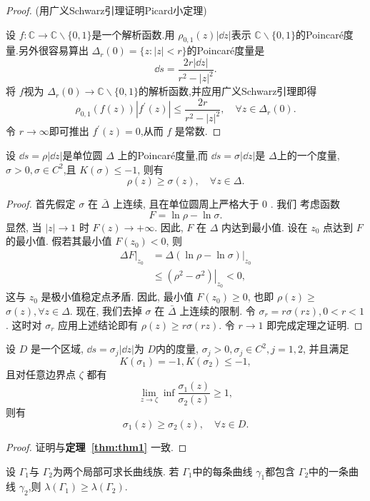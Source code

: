 \begin{proof}{(用广义Schwarz引理证明Picard小定理)}

    设 $f\colon \mathbb{C}\to \mathbb{C}\backslash \{0,1\} $是一个解析函数.用 $\rho_{0,1}(z)|\dd z|$表示 $\mathbb{C}\backslash \{0,1\}$的Poincar\'{e}度量.另外很容易算出 $\Delta_r (0)=\{z\colon |z|<r\}$的Poincar\'{e}度量是
    \[\dd s=\frac{2r|\dd z|}{r^2-|z|^2}.\]
    将 $f$视为 $\Delta_r (0)\to \mathbb{C}\backslash\{0,1\}$的解析函数,并应用广义Schwarz引理即得
    \[\rho_{0,1}(f(z))|f^\prime (z)|\leqslant \frac{2r}{r^2-|z|^2},\quad\forall z\in \Delta_r (0).\]
    令 $r\to\infty$即可推出 $f^\prime (z)=0$,从而 $f$ 是常数.
\end{proof}
\begin{thm}\label{thm:thm1}
    设 $\dd s=\rho |\dd z|$是单位圆 $\Delta$ 上的Poincar\'{e}度量,而 $\dd s=\sigma|\dd z|$是 $\Delta$上的一个度量, $\sigma>0,\sigma\in C^2$,且 $K(\sigma)\leqslant -1$, 则有
    \[\rho(z)\geqslant \sigma(z),\quad\forall z\in \Delta.\]
\end{thm}
\begin{proof}
    首先假定 $\sigma$ 在 $\bar{\Delta}$ 上连续, 且在单位圆周上严格大于 0 . 我们 考虑函数
$$
F=\ln \rho-\ln \sigma .
$$
显然, 当 $|z| \rightarrow 1$ 时 $F(z) \rightarrow+\infty$. 因此, $F$ 在 $\Delta$ 内达到最小值. 设在 $z_0$ 点达到 $F$ 的最小值. 假若其最小值 $F\left(z_0\right)<0$, 则
$$
\begin{aligned}
\left.\Delta F\right|_{z_0} & =\left.\Delta(\ln \rho-\ln \sigma)\right|_{z_0} \\
& \leqslant\left.\left(\rho^2-\sigma^2\right)\right|_{z_0}<0,
\end{aligned}
$$
这与 $z_0$ 是极小值稳定点矛盾. 因此, 最小值 $F\left(z_0\right) \geqslant 0$, 也即 $\rho(z) \geqslant$ $\sigma(z), \forall z \in \Delta$.
现在, 我们去掉 $\sigma$ 在 $\bar{\Delta}$ 上连续的限制. 令 $\sigma_r=r \sigma(r z), 0<r<1$. 这时对 $\sigma_r$ 应用上述结论即有 $\rho(z) \geqslant r \sigma(r z)$. 令 $r \rightarrow 1$ 即完成定理之证明.
\end{proof}
\begin{corollary}
    设 $D$ 是一个区域, $\dd s=\sigma_j |\dd z|$为 $D$内的度量, $\sigma_j>0,\sigma_j\in C^2,j=1,2$, 并且满足
    \[K(\sigma_1)=-1,K(\sigma_2)\leqslant -1,\]
    且对任意边界点 $\zeta$ 都有
    \[\lim_{z\to\zeta}\inf \frac{\sigma_1 (z)}{\sigma_2 (z)}\geqslant 1,\]
    则有
    \[\sigma_1 (z)\geqslant \sigma_2 (z),\quad\forall z\in D.\]
\end{corollary}
\begin{proof}
    证明与\textbf{定理~\ref{thm:thm1}} 一致.
\end{proof}
\begin{theorem}
    设 $\Gamma_1$与 $\Gamma_2$为两个局部可求长曲线族. 若 $\Gamma_1$中的每条曲线 $\gamma_1$都包含 $\Gamma_2$中的一条曲线 $\gamma_2$,则 $\lambda (\Gamma_1)\geqslant \lambda (\Gamma_2)$.
\end{theorem}

